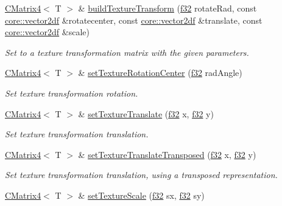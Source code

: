 \begin{DoxyCompactItemize}
\hyperlink{classirr_1_1core_1_1CMatrix4}{C\+Matrix4}$<$ T $>$ \& \hyperlink{classirr_1_1core_1_1CMatrix4_afc72faaf2c883d9c0fdc1e0940d1acde}{build\+Texture\+Transform} (\hyperlink{namespaceirr_a0277be98d67dc26ff93b1a6a1d086b07}{f32} rotate\+Rad, const \hyperlink{namespaceirr_1_1core_a2cf08556d77f6f5a792973a6e27ed11b}{core\+::vector2df} \&rotatecenter, const \hyperlink{namespaceirr_1_1core_a2cf08556d77f6f5a792973a6e27ed11b}{core\+::vector2df} \&translate, const \hyperlink{namespaceirr_1_1core_a2cf08556d77f6f5a792973a6e27ed11b}{core\+::vector2df} \&scale)
\begin{DoxyCompactList}\small\item\em Set to a texture transformation matrix with the given parameters. \end{DoxyCompactList}\item 
\hyperlink{classirr_1_1core_1_1CMatrix4}{C\+Matrix4}$<$ T $>$ \& \hyperlink{classirr_1_1core_1_1CMatrix4_a445a7653292ae4ffb0baa50032a8674e}{set\+Texture\+Rotation\+Center} (\hyperlink{namespaceirr_a0277be98d67dc26ff93b1a6a1d086b07}{f32} rad\+Angle)
\begin{DoxyCompactList}\small\item\em Set texture transformation rotation. \end{DoxyCompactList}\item 
\hyperlink{classirr_1_1core_1_1CMatrix4}{C\+Matrix4}$<$ T $>$ \& \hyperlink{classirr_1_1core_1_1CMatrix4_a2bab9633697a892f08d89c7aeee6daf6}{set\+Texture\+Translate} (\hyperlink{namespaceirr_a0277be98d67dc26ff93b1a6a1d086b07}{f32} x, \hyperlink{namespaceirr_a0277be98d67dc26ff93b1a6a1d086b07}{f32} y)
\begin{DoxyCompactList}\small\item\em Set texture transformation translation. \end{DoxyCompactList}\item 
\hyperlink{classirr_1_1core_1_1CMatrix4}{C\+Matrix4}$<$ T $>$ \& \hyperlink{classirr_1_1core_1_1CMatrix4_a7d999210cc7427e9d744271e50d26c3c}{set\+Texture\+Translate\+Transposed} (\hyperlink{namespaceirr_a0277be98d67dc26ff93b1a6a1d086b07}{f32} x, \hyperlink{namespaceirr_a0277be98d67dc26ff93b1a6a1d086b07}{f32} y)
\begin{DoxyCompactList}\small\item\em Set texture transformation translation, using a transposed representation. \end{DoxyCompactList}\item 
\hyperlink{classirr_1_1core_1_1CMatrix4}{C\+Matrix4}$<$ T $>$ \& \hyperlink{classirr_1_1core_1_1CMatrix4_aed32a7a8da9c4cee5babe8f6b4aa7dd4}{set\+Texture\+Scale} (\hyperlink{namespaceirr_a0277be98d67dc26ff93b1a6a1d086b07}{f32} sx, \hyperlink{namespaceirr_a0277be98d67dc26ff93b1a6a1d086b07}{f32} sy)

\end{DoxyCompactItemize}
